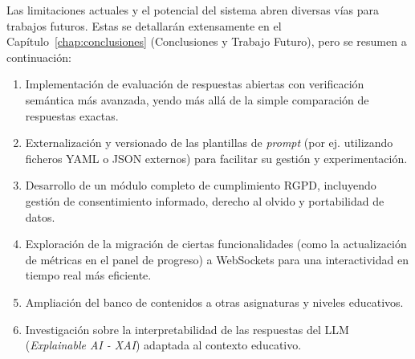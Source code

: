 Las limitaciones actuales y el potencial del sistema abren diversas vías para trabajos futuros. Estas se detallarán extensamente en el Capítulo~\ref{chap:conclusiones} (Conclusiones y Trabajo Futuro), pero se resumen a continuación:
\begin{enumerate}[label=\arabic*),leftmargin=*]
  \item Implementación de evaluación de respuestas abiertas con verificación semántica más avanzada, yendo más allá de la simple comparación de respuestas exactas.
  \item Externalización y versionado de las plantillas de \emph{prompt} (por ej. utilizando ficheros YAML o JSON externos) para facilitar su gestión y experimentación.
  \item Desarrollo de un módulo completo de cumplimiento RGPD, incluyendo gestión de consentimiento informado, derecho al olvido y portabilidad de datos.
  \item Exploración de la migración de ciertas funcionalidades (como la actualización de métricas en el panel de progreso) a WebSockets para una interactividad en tiempo real más eficiente.
  \item Ampliación del banco de contenidos a otras asignaturas y niveles educativos.
  \item Investigación sobre la interpretabilidad de las respuestas del LLM (\emph{Explainable AI - XAI}) adaptada al contexto educativo.
\end{enumerate}

